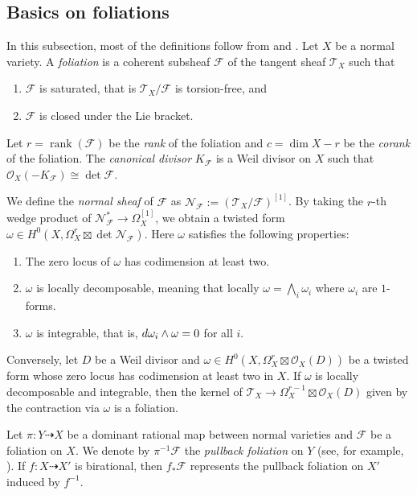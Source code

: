 \documentclass[12pt,reqno]{amsart}
\theoremstyle{definition}
\newcommand{\on}{\operatorname}
\newcommand\cF{{\mathcal{F}}}
\newcommand\cN{{\mathcal{N}}}
\newcommand\cO{{\mathcal{O}}}
\newcommand\cT{{\mathcal{T}}}
\newcommand{\diff}{\textnormal{d}}
\begin{document}
\subsection{Basics on foliations}
In this subsection, most of the definitions follow from \cite{CS} and \cite{druel2021foliation}. 
Let $X$ be a normal variety. A \emph{foliation} is a coherent subsheaf $\cF$ of the tangent sheaf $\cT_X$ such that
\begin{enumerate}
\item $\cF$ is saturated, that is $\cT_X/\cF$ is torsion-free, and
\item $\cF$ is closed under the Lie bracket.
\end{enumerate}

Let $r=\on{rank}(\cF)$ be the \emph{rank} of the foliation and $c=\dim X-r$ be the \emph{corank} of the foliation. 
The \emph{canonical divisor} $K_\cF$ is a Weil divisor on $X$ such that $\cO_X(-K_\cF)\cong\det\cF$. 

We define the \emph{normal sheaf} of $\cF$ as $\cN_{\cF}:=(\cT_X/\cF)^{[1]}$. 
By taking the $r$-th wedge product of $\cN_{\cF}^*\to\Omega_X^{[1]}$, we obtain a twisted form $\omega\in H^0(X,\Omega_X^{r}\boxtimes\on{det}\cN_{\cF})$. 
Here $\omega$ satisfies the following  properties:
\begin{enumerate}
\item The zero locus of $\omega$ has codimension at least two. 
\item $\omega$ is locally decomposable, meaning that locally $\omega=\bigwedge_i\omega_i$ where $\omega_i$ are $1$-forms.
\item $\omega$ is integrable, that is, $\diff\omega_i\wedge\omega=0$ for all $i$.
\end{enumerate}

Conversely, let $D$ be a Weil divisor and $\omega\in H^0(X,\Omega_X^{r}\boxtimes\cO_X(D))$ be a twisted form  
whose zero locus has codimension at least two in $X$. If $\omega$ is locally decomposable and integrable, then the kernel of
$\cT_X\to \Omega_X^{r-1}\boxtimes\cO_X(D)$ given by the contraction via $\omega$ is a foliation.

Let $\pi\colon Y \dashrightarrow X$ be a dominant rational map between normal varieties and $\cF$ be a foliation on $X$. 
We denote by $\pi^{-1}\cF$ the \emph{pullback foliation} on $Y$ (see, for example, \cite[Section 3.2]{druel2021foliation}). 
If $f\colon X\dashrightarrow X'$ is birational, then $f_*\mathcal{F}$ represents the pullback foliation on $X'$ induced by $f^{-1}$.
\end{document}
